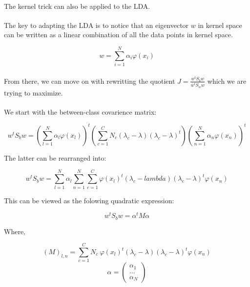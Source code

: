 \paragraph{}
The kernel trick can also be applied to the LDA.

\paragraph{}
The key to adapting the LDA is to notice that an eigenvector $w$ in kernel space can be written as a
linear combination of all the data points in kernel space.

\begin{equation} \label{phibase} w = \sum_{i=1}^N \alpha_i \varphi(x_i) \end{equation}

\paragraph{}
From there, we can move on with rewritting the quotient $J = \frac{w^tS_bw}{w^tS_ww}$ which we are
trying to maximize.

\paragraph{}
We start with the between-class covarience matrix:

$$w^tS_bw = \left( \sum_{l=1}^N \alpha_l \varphi(x_l)\right)^t
            \left( \sum_{c=1}^C N_c(\lambda_c - \lambda)(\lambda_c - \lambda)^t\right)
            \left( \sum_{n=1}^N \alpha_n \varphi(x_n)\right)^t $$

The latter can be rearranged into:

$$w^tS_bw = \sum_{l=1}^N\alpha_l \sum_{n=1}^N \sum_{c =1}^C 
                \varphi(x_l)^t(\lambda_c - lambda)(\lambda_c - \lambda)^t\varphi(x_n)$$

This can be viewed as the folowing quadratic expression:

$$w^tS_bw = \alpha^tM\alpha$$

Where,

$$ (M)_{l,n} = \sum_{c=1}^C N_c ~\varphi(x_l)^t (\lambda_c - \lambda)(\lambda_c -\lambda)^t
\varphi(x_n) $$
$$\alpha = \left( \begin{array}{c}
                                \alpha_1 \\
                                ... \\
                                \alpha_N
                  \end{array}  \right) $$


